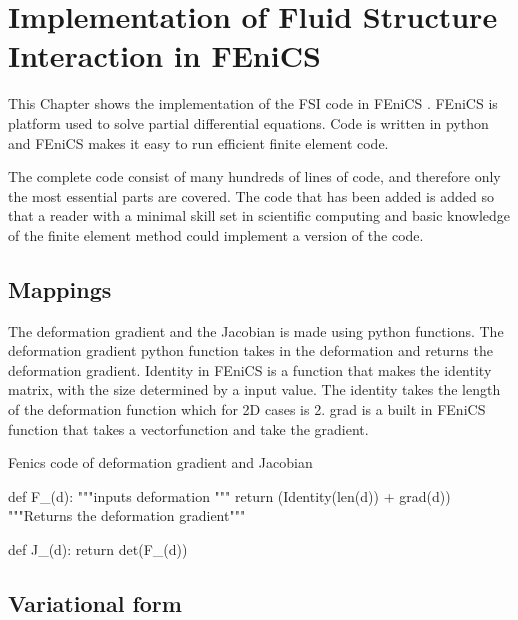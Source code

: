 \begin{comment}
\lstdefinelanguage{Python}{
 keywords={typeof, null, catch, switch, in, int, str, float, self},
 ndkeywords={boolean, throw, import},
 ndkeywords={return, class, if ,elif, endif, while, do, else, True, False , catch, def},
 ndkeywordstyle=\color{blue}\bfseries,
 identifierstyle=\color{black},
 sensitive=false,
 comment=[l]{\#},
 morecomment=[s]{/*}{*/},
 commentstyle=\color{purple}\ttfamily,
 stringstyle=\color{red}\ttfamily,
 backgroundcolor = \color{lightgray}
}
\end{comment}


\chapter{Implementation of Fluid Structure Interaction in FEniCS}
This Chapter shows the implementation of the FSI code in FEniCS \cite{FENICS}. FEniCS is platform used to solve partial differential equations. Code is written in python and FEniCS makes it easy to run efficient finite element code. \newline

The complete code consist of many hundreds of lines of code, and therefore only the most essential parts are covered. The code that has been added is added so that a reader with a minimal skill set in scientific computing and basic knowledge of the finite element method could implement a version of the code.



\section{Mappings}
The deformation gradient and the Jacobian is made using python functions. The deformation gradient python function takes in the deformation and returns the deformation gradient. Identity in FEniCS is a function that makes the identity matrix, with the size determined by a input value. The identity takes the length of the deformation function which for 2D cases is 2. grad is a built in FEniCS function that takes a vectorfunction and take the gradient.
\begin{python}\caption{Fenics code of deformation gradient and Jacobian}
def F_(d): """inputs deformation """
	return (Identity(len(d)) + grad(d))  """Returns the deformation gradient"""

def J_(d):
	return det(F_(d))
\end{python}


\section{Variational form}


